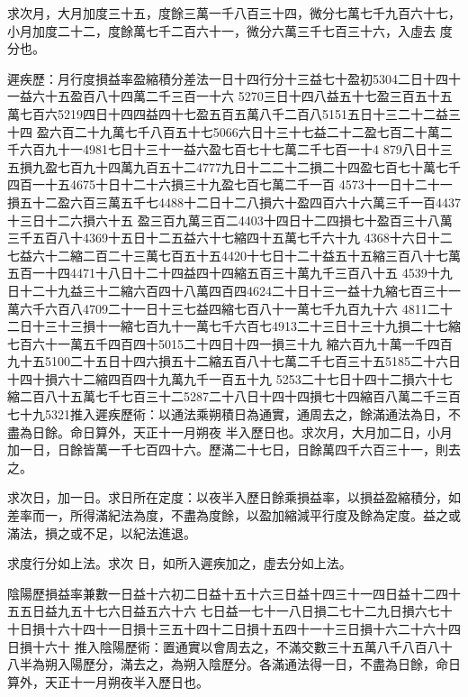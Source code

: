 \begin{pinyinscope}
 求次月，大月加度三十五，度餘三萬一千八百三十四，微分七萬七千九百六十七，小月加度二十二，度餘萬七千二百六十一，微分六萬三千七百三十六，入虛去
 度分也。



 遲疾歷：月行度損益率盈縮積分差法一日十四行分十三益七十盈初5304二日十四十一益六十五盈百八十四萬二千三百一十六
 5270三日十四八益五十七盈三百五十五萬七百六5219四日十四四益四十七盈五百五萬八千二百八5151五日十三二十二益三十四
 盈六百二十九萬七千八百五十七5066六日十三十七益二十二盈七百二十萬二千六百九十一4981七日十三十一益六盈七百七十七萬二千七百一十4
 879八日十三五損九盈七百九十四萬九百五十二4777九日十二二十二損二十四盈七百七十萬七千四百一十五4675十日十二十六損三十九盈七百七萬二千一百
 4573十一日十二十一損五十二盈六百三萬五千七4488十二日十二八損六十盈四百六十六萬三千一百4437十三日十二六損六十五
 盈三百九萬三百二4403十四日十二四損七十盈百三十八萬三千五百八十4369十五日十二五益六十七縮四十五萬七千六十九
 4368十六日十二七益六十二縮二百二十三萬七百五十五4420十七日十二十益五十五縮三百八十七萬五百一十四4471十八日十二十四益四十四縮五百三十萬九千三百八十五
 4539十九日十二十九益三十二縮六百四十八萬四百四4624二十日十三一益十九縮七百三十一萬六千六百八4709二十一日十三七益四縮七百八十一萬七千九百九十六
 4811二十二日十三十三損十一縮七百九十一萬七千六百七4913二十三日十三十九損二十七縮七百六十一萬五千四百四十5015二十四日十四一損三十九
 縮六百九十萬一千四百九十五5100二十五日十四六損五十二縮五百八十七萬二千七百三十五5185二十六日十四十損六十二縮四百四十九萬九千一百五十九
 5253二十七日十四十二損六十七縮二百八十五萬七千七百三十二5287二十八日十四十四損七十四縮百八萬二千三百七十九5321推入遲疾歷術：以通法乘朔積日為通實，通周去之，餘滿通法為日，不盡為日餘。命日算外，天正十一月朔夜
 半入歷日也。求次月，大月加二日，小月加一日，日餘皆萬一千七百四十六。歷滿二十七日，日餘萬四千六百三十一，則去之。



 求次日，加一日。求日所在定度：以夜半入歷日餘乘損益率，以損益盈縮積分，如差率而一，所得滿紀法為度，不盡為度餘，以盈加縮減平行度及餘為定度。益之或滿法，損之或不足，以紀法進退。



 求度行分如上法。求次
 日，如所入遲疾加之，虛去分如上法。



 陰陽歷損益率兼數一日益十六初二日益十五十六三日益十四三十一四日益十二四十五五日益九五十七六日益五六十六
 七日益一七十一八日損二七十二九日損六七十十日損十六十四十一日損十三五十四十二日損十五四十一十三日損十六二十六十四日損十六十
 推入陰陽歷術：置通實以會周去之，不滿交數三十五萬八千八百八十八半為朔入陽歷分，滿去之，為朔入陰歷分。各滿通法得一日，不盡為日餘，命日算外，天正十一月朔夜半入歷日也。




\end{pinyinscope}
